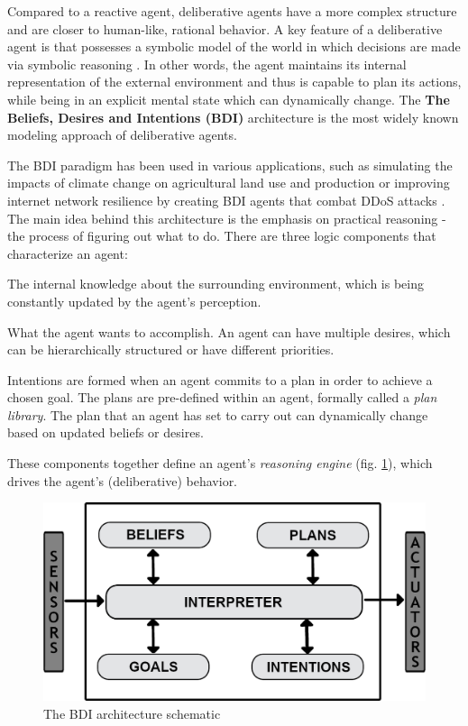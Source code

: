 \documentclass[0main.tex]{subfiles}
\begin{document}
Compared to a reactive agent, deliberative agents have a more complex structure and are closer to 
human-like, rational behavior. A key feature of a deliberative agent is that
possesses a symbolic model of the world in which
decisions are made via symbolic reasoning \cite{Wooldridge1996}. In other words,
the agent maintains its internal representation of the external environment and
thus is capable to plan its actions, while being in an explicit mental state which
can dynamically change. The \textbf{The Beliefs, Desires and Intentions (BDI)} architecture
is the most widely known modeling approach of deliberative agents.

The BDI paradigm has been used in various applications, such as simulating the impacts of climate
change on agricultural land use and production \cite{Caillou2017} or improving internet
network resilience by creating BDI agents that combat DDoS attacks \cite{Nunes2017}. The main
idea behind this architecture is the emphasis on practical reasoning - the process of figuring
out what to do. There are three logic components that characterize an agent:

The internal knowledge about the surrounding environment, which
is being constantly updated by the agent's perception.

What the agent wants to accomplish. An agent can have multiple desires, which can be
hierarchically structured or have different priorities.

Intentions are formed when an agent commits to a plan in order to achieve a chosen goal.
The plans are pre-defined within an agent, formally called a \emph{plan library}.
The plan that an agent has set to carry out can dynamically change based on updated beliefs or
desires.

These components together define an agent's \emph{reasoning engine} (fig. \ref{bdi-schematic}),
which drives the agent's (deliberative) behavior. 

\begin{figure}[htbp]
    \centering
    \includegraphics[width = .8\textwidth]{bdi-infographic-unified.png}
    \caption{The BDI architecture schematic}
    \label{bdi-schematic}
\end{figure}
\end{document}
